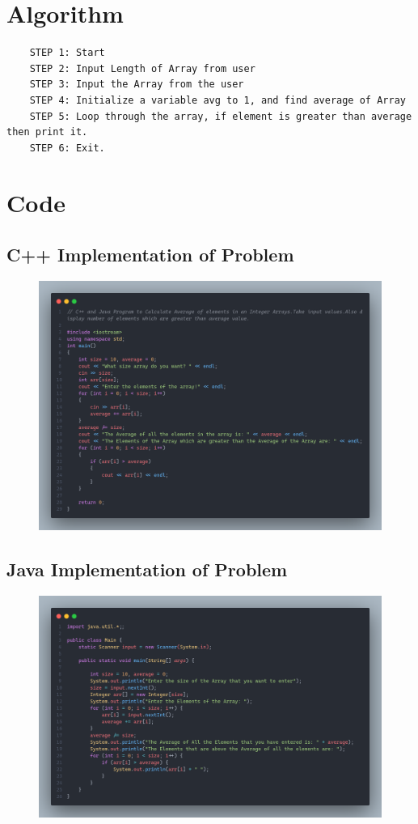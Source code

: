 \documentclass[11pt]{article}
\begin{document}
\section{Algorithm}
\begin{verbatim}
	STEP 1: Start
	STEP 2: Input Length of Array from user
	STEP 3: Input the Array from the user
	STEP 4: Initialize a variable avg to 1, and find average of Array
	STEP 5: Loop through the array, if element is greater than average then print it. 
	STEP 6: Exit. 
\end{verbatim}

\section{Code}
\subsection{C++ Implementation of Problem}
\begin{figure}[H]
	\centering
	\includegraphics[scale=0.22]{codec.png}
	\caption{}
\end{figure}
% 

\subsection{Java Implementation of Problem}
\begin{figure}[H]
	\centering
	\includegraphics[scale=0.22]{code.png}
	\caption{}
\end{figure}
\end{document}
